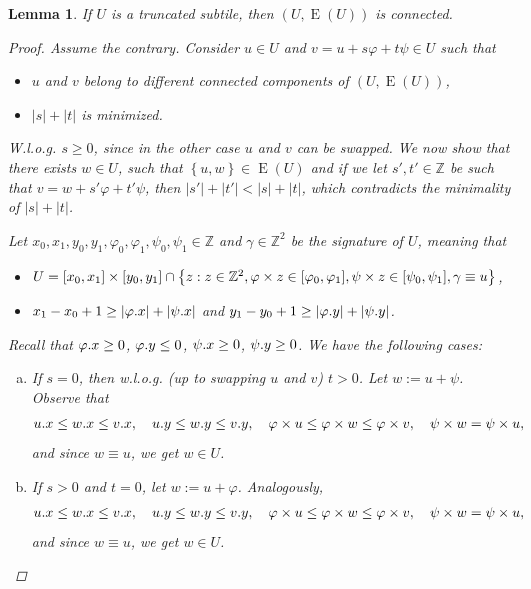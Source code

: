 \documentclass[11pt, letterpaper]{article}
\theoremstyle{plain}
\newtheorem{lemma}{Lemma}
\theoremstyle{definition}
\theoremstyle{remark}
\newcommand{\Z}{\mathbb{Z}}
\renewcommand{\phi}{\varphi}
\newcommand{\set}[1]{\left\lbrace #1 \right\rbrace}
\newcommand{\eq}[1]{\begin{align*} #1 \end{align*}}
\DeclareMathOperator*{\Edges}{E}
\newcommand{\absolute}[1]{\left\lvert#1\right\rvert}
\begin{document}
\begin{lemma}\label{lattice_graph_connectivity}
	If $U$ is a truncated subtile, then $(U, \Edges(U))$ is connected.
	\begin{proof}
		Assume the contrary.
		Consider $u \in U$ and $v = u + s \phi + t \psi \in U$ such that
		\begin{itemize}
			\item $u$ and $v$ belong to different connected components of $(U, \Edges(U))$,
			\item $\absolute{s} + \absolute{t}$ is minimized.
		\end{itemize}
		W.l.o.g. $s \ge 0$, since in the other case $u$ and $v$ can be swapped.
		We now show that there exists $w \in U$, such that $\set{u, w} \in \Edges(U)$ and if we let $s', t' \in \Z$ be such that $v = w + s'\phi + t'\psi$, then $\absolute{s'} + \absolute{t'} < \absolute{s} + \absolute{t}$, which contradicts the minimality of $\absolute{s} + \absolute{t}$. 
	
		Let $x_0, x_1, y_0, y_1, \phi_0, \phi_1, \psi_0, \psi_1 \in \Z$ and $\gamma \in \Z^2$ be the signature of $U$, meaning that
		\begin{itemize}
			\item $ U = [x_0, x_1] \times [y_0, y_1] \cap \set{z : z \in \Z^2, \h{z} \in [\phi_0, \phi_1], \s{z} \in [\psi_0, \psi_1], \gamma \equiv u}$,
			\item $x_1 - x_0 + 1 \ge \absolute{\x{\phi}} + \absolute{\x{\psi}}$ and $y_1 - y_0 + 1 \ge \absolute{\y{\phi}} + \absolute{\y{\psi}}$.
		\end{itemize}
		
		Recall that $\x{\phi} \ge 0$, $\y{\phi} \le 0$, $\psi.x \ge 0$, $\psi.y \ge 0$. We have the following cases:
		\begin{enumerate}[(a)]
			\item \label{it:s0_tneg} If $s = 0$, then w.l.o.g. (up to swapping $u$ and $v$) $t > 0$. Let $w := u + \psi$. Observe that
				\eq{
					\x{u} \le \x{w} \le \x{v}, \quad \y{u} \le \y{w} \le \y{v}, \quad \h{u} \le \h{w} \le \h{v}, \quad \s{w} = \s{u},
				}
				and since $w \equiv u$, we get $w \in U$. 
			
			\item If $s > 0$ and $t = 0$, let $w := u + \phi$. Analogously, 
				\eq{
					\x{u} \le \x{w} \le \x{v}, \quad \y{u} \le \y{w} \le \y{v}, \quad \h{u} \le \h{w} \le \h{v}, \quad \s{w} = \s{u},
				}
				and since $w \equiv u$, we get $w \in U$. 
			

\end{enumerate}
\end{proof}
\end{lemma}
\end{document}
